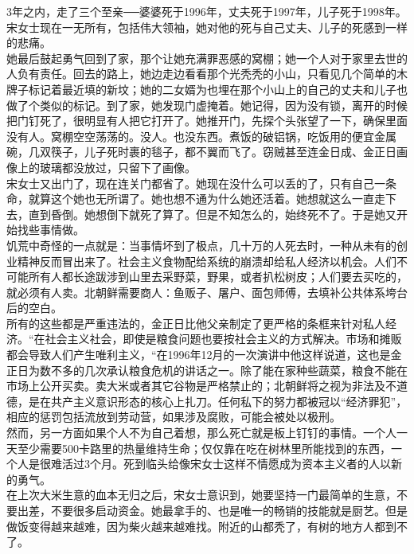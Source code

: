 3年之内，走了三个至亲──婆婆死于1996年，丈夫死于1997年，儿子死于1998年。宋女士现在一无所有，包括伟大领袖，她对他的死与自己丈夫、儿子的死感到一样的悲痛。\\

她最后鼓起勇气回到了家，那个让她充满罪恶感的窝棚；她一个人对于家里去世的人负有责任。回去的路上，她边走边看看那个光秃秃的小山，只看见几个简单的木牌子标记着最近填的新坟；她的二女婿为也埋在那个小山上的自己的丈夫和儿子也做了个类似的标记。到了家，她发现门虚掩着。她记得，因为没有锁，离开的时候把门钉死了，很明显有人把它打开了。她推开门，先探个头张望了一下，确保里面没有人。窝棚空空荡荡的。没人。也没东西。煮饭的破铝锅，吃饭用的便宜金属碗，几双筷子，儿子死时裹的毯子，都不翼而飞了。窃贼甚至连金日成、金正日画像上的玻璃都没放过，只留下了画像。\\

宋女士又出门了，现在连关门都省了。她现在没什么可以丢的了，只有自己一条命，就算这个她也无所谓了。她也想不通为什么她还活着。她想就这么一直走下去，直到昏倒。她想倒下就死了算了。但是不知怎么的，始终死不了。于是她又开始找些事情做。\\

饥荒中奇怪的一点就是：当事情坏到了极点，几十万的人死去时，一种从未有的创业精神反而冒出来了。社会主义食物配给系统的崩溃却给私人经济以机会。人们不可能所有人都长途跋涉到山里去采野菜，野果，或者扒松树皮；人们要去买吃的，就必须有人卖。北朝鲜需要商人：鱼贩子、屠户、面包师傅，去填补公共体系垮台后的空白。\\

所有的这些都是严重违法的，金正日比他父亲制定了更严格的条框来针对私人经济。“在社会主义社会，即使是粮食问题也要按社会主义的方式解决。市场和摊贩都会导致人们产生唯利主义，“在1996年12月的一次演讲中他这样说道，这也是金正日为数不多的几次承认粮食危机的讲话之一。除了能在家种些蔬菜，粮食不能在市场上公开买卖。卖大米或者其它谷物是严格禁止的；北朝鲜将之视为非法及不道德，是在共产主义意识形态的核心上扎刀。任何私下的努力都被冠以“经济罪犯”，相应的惩罚包括流放到劳动营，如果涉及腐败，可能会被处以极刑。\\

然而，另一方面如果个人不为自己着想，那么死亡就是板上钉钉的事情。一个人一天至少需要500卡路里的热量维持生命；仅仅靠在吃在树林里所能找到的东西，一个人是很难活过3个月。死到临头给像宋女士这样不情愿成为资本主义者的人以新的勇气。\\

在上次大米生意的血本无归之后，宋女士意识到，她要坚持一门最简单的生意，不要出差，不要很多启动资金。她最拿手的、也是唯一的畅销的技能就是厨艺。但是做饭变得越来越难，因为柴火越来越难找。附近的山都秃了，有树的地方人都到不了。\\

